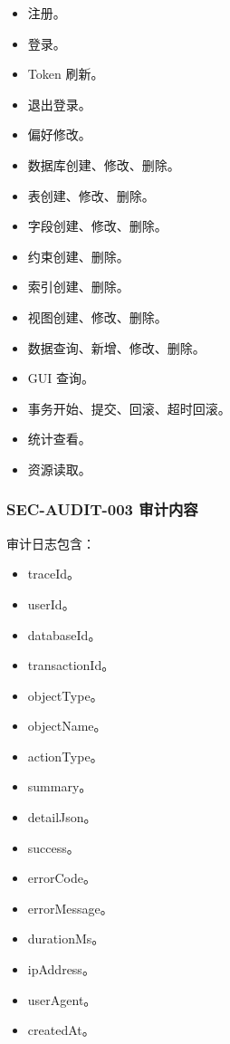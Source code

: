 \documentclass[
  a4paper,
  UTF8]{ctexart}
\providecommand{\tightlist}{%
  \setlength{\itemsep}{0pt}\setlength{\parskip}{0pt}}
\begin{document}
\begin{itemize}
\tightlist
\item
  注册。
\item
  登录。
\item
  Token 刷新。
\item
  退出登录。
\item
  偏好修改。
\item
  数据库创建、修改、删除。
\item
  表创建、修改、删除。
\item
  字段创建、修改、删除。
\item
  约束创建、删除。
\item
  索引创建、删除。
\item
  视图创建、修改、删除。
\item
  数据查询、新增、修改、删除。
\item
  GUI 查询。
\item
  事务开始、提交、回滚、超时回滚。
\item
  统计查看。
\item
  资源读取。
\end{itemize}

\hypertarget{sec-audit-003-ux5ba1ux8ba1ux5185ux5bb9}{%
\subsubsection{SEC-AUDIT-003
审计内容}\label{sec-audit-003-ux5ba1ux8ba1ux5185ux5bb9}}

审计日志包含：

\begin{itemize}
\tightlist
\item
  traceId。
\item
  userId。
\item
  databaseId。
\item
  transactionId。
\item
  objectType。
\item
  objectName。
\item
  actionType。
\item
  summary。
\item
  detailJson。
\item
  success。
\item
  errorCode。
\item
  errorMessage。
\item
  durationMs。
\item
  ipAddress。
\item
  userAgent。
\item
  createdAt。
\end{itemize}
\end{document}
